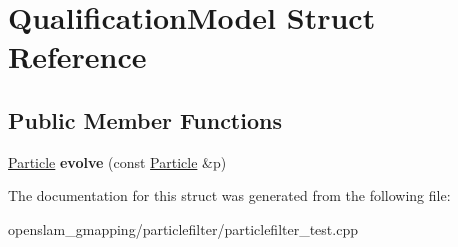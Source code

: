 \hypertarget{structQualificationModel}{}\section{Qualification\+Model Struct Reference}
\label{structQualificationModel}
\subsection*{Public Member Functions}
\begin{DoxyCompactItemize}
\item 
\mbox{\label{structQualificationModel_a3f5dffd44cfa5ba3f8675f3b18399dd2}} 
\hyperlink{structParticle}{Particle} {\bfseries evolve} (const \hyperlink{structParticle}{Particle} \&p)
\end{DoxyCompactItemize}


The documentation for this struct was generated from the following file\+:\begin{DoxyCompactItemize}
\item 
openslam\+\_\+gmapping/particlefilter/particlefilter\+\_\+test.\+cpp\end{DoxyCompactItemize}

